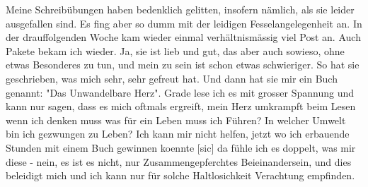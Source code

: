 \def\day{27. Oktober 42 *}
\mktitle

Meine Schreib\"{u}bungen haben bedenklich gelitten, insofern n\"{a}mlich, als sie leider ausgefallen sind.
Es fing aber so dumm mit der leidigen Fesselangelegenheit an.
In der drauffolgenden Woche kam wieder einmal verh\"{a}ltnism\"{a}ssig viel Post an.
Auch Pakete bekam ich wieder.
Ja, sie ist lieb und gut, das aber auch sowieso, ohne etwas Besonderes zu tun, und mein zu sein ist schon etwas schwieriger.
So hat sie geschrieben, was mich sehr, sehr gefreut hat.
Und dann hat sie mir ein Buch genannt: "Das Unwandelbare Herz".
Grade lese ich es mit grosser Spannung und kann nur sagen, dass es mich oftmals ergreift, mein Herz umkrampft beim Lesen wenn ich denken muss was f\"{u}r ein Leben muss ich F\"{u}hren?
In welcher Umwelt bin ich gezwungen zu Leben?
Ich kann mir nicht helfen, jetzt wo ich erbauende Stunden mit einem Buch gewinnen koennte{\color{red} [sic] } da f\"{u}hle ich es doppelt, was mir diese - nein, es ist es nicht, nur Zusammengepferchtes Beieinandersein, und dies beleidigt mich und ich kann nur f\"{u}r solche Haltlosichkeit Verachtung empfinden.

\clearpage
